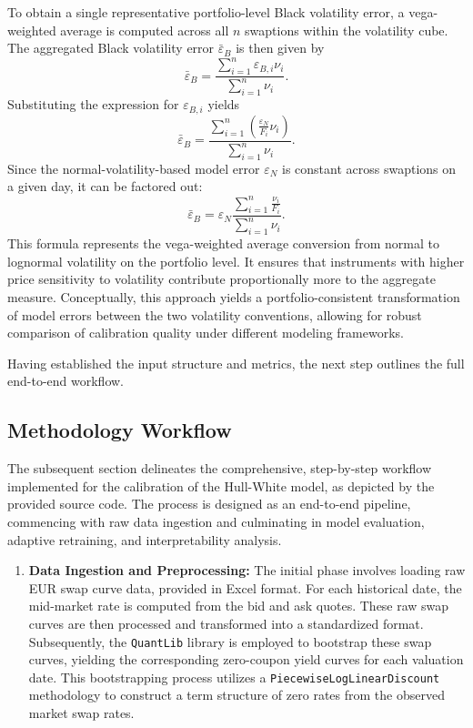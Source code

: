 {To obtain a single representative portfolio-level Black volatility error, a vega-weighted average is computed across all \( n \) swaptions within the volatility cube. The aggregated Black volatility error \( \bar{\varepsilon}_B \) is then given by
\begin{equation}
	\bar{\varepsilon}_B = \frac{\sum_{i=1}^{n} \varepsilon_{B,i} \nu_i}{\sum_{i=1}^{n} \nu_i}.
\end{equation}
Substituting the expression for \( \varepsilon_{B,i} \) yields
\begin{equation}
	\bar{\varepsilon}_B = \frac{\sum_{i=1}^{n} \left( \frac{\varepsilon_N}{F_i} \nu_i \right)}{\sum_{i=1}^{n} \nu_i}.
\end{equation}
Since the normal-volatility-based model error \( \varepsilon_N \) is constant across swaptions on a given day, it can be factored out:
\begin{equation}
	\bar{\varepsilon}_B = \varepsilon_N \frac{\sum_{i=1}^{n} \frac{\nu_i}{F_i}}{\sum_{i=1}^{n} \nu_i}.
\end{equation}
This formula represents the vega-weighted average conversion from normal to lognormal volatility on the portfolio level. It ensures that instruments with higher price sensitivity to volatility contribute proportionally more to the aggregate measure. Conceptually, this approach yields a portfolio-consistent transformation of model errors between the two volatility conventions, allowing for robust comparison of calibration quality under different modeling frameworks.

Having established the input structure and metrics, the next step outlines the full end-to-end workflow.

\subsection{Methodology Workflow}
The subsequent section delineates the comprehensive, step-by-step workflow implemented for the calibration of the Hull-White model, as depicted by the provided source code. The process is designed as an end-to-end pipeline, commencing with raw data ingestion and culminating in model evaluation, adaptive retraining, and interpretability analysis.

\begin{enumerate}
	\item \textbf{Data Ingestion and Preprocessing:}
	      The initial phase involves loading raw EUR swap curve data, provided in Excel format. For each historical date, the mid-market rate is computed from the bid and ask quotes. These raw swap curves are then processed and transformed into a standardized format. Subsequently, the \texttt{QuantLib} library is employed to bootstrap these swap curves, yielding the corresponding zero-coupon yield curves for each valuation date. This bootstrapping process utilizes a \texttt{PiecewiseLogLinearDiscount} methodology to construct a term structure of zero rates from the observed market swap rates.


\end{enumerate}}
